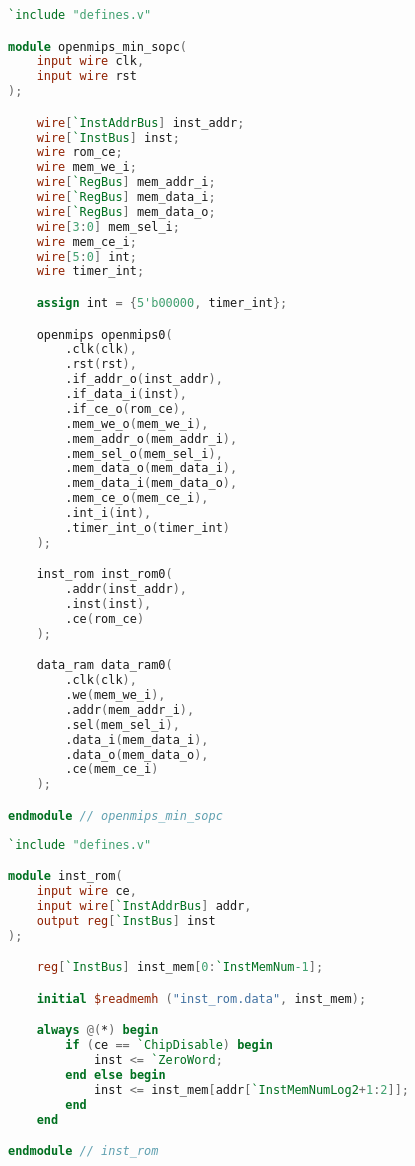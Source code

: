 \begin{lstlisting}[language=verilog]
`include "defines.v"

module openmips_min_sopc(
    input wire clk,
    input wire rst
);

    wire[`InstAddrBus] inst_addr;
    wire[`InstBus] inst;
    wire rom_ce;
    wire mem_we_i;
    wire[`RegBus] mem_addr_i;
    wire[`RegBus] mem_data_i;
    wire[`RegBus] mem_data_o;
    wire[3:0] mem_sel_i;
    wire mem_ce_i;
    wire[5:0] int;
    wire timer_int;

    assign int = {5'b00000, timer_int};

    openmips openmips0(
        .clk(clk),
        .rst(rst),
        .if_addr_o(inst_addr),
        .if_data_i(inst),
        .if_ce_o(rom_ce),
        .mem_we_o(mem_we_i),
        .mem_addr_o(mem_addr_i),
        .mem_sel_o(mem_sel_i),
        .mem_data_o(mem_data_i),
        .mem_data_i(mem_data_o),
        .mem_ce_o(mem_ce_i),
        .int_i(int),
        .timer_int_o(timer_int)
    );

    inst_rom inst_rom0(
        .addr(inst_addr),
        .inst(inst),
        .ce(rom_ce)
    );

    data_ram data_ram0(
        .clk(clk),
        .we(mem_we_i),
        .addr(mem_addr_i),
        .sel(mem_sel_i),
        .data_i(mem_data_i),
        .data_o(mem_data_o),
        .ce(mem_ce_i)
    );

endmodule // openmips_min_sopc
\end{lstlisting}

\begin{lstlisting}[language=verilog]
`include "defines.v"

module inst_rom(
    input wire ce,
    input wire[`InstAddrBus] addr,
    output reg[`InstBus] inst
);

    reg[`InstBus] inst_mem[0:`InstMemNum-1];

    initial $readmemh ("inst_rom.data", inst_mem);

    always @(*) begin
        if (ce == `ChipDisable) begin
            inst <= `ZeroWord; 
        end else begin
            inst <= inst_mem[addr[`InstMemNumLog2+1:2]];
        end
    end

endmodule // inst_rom
\end{lstlisting}

